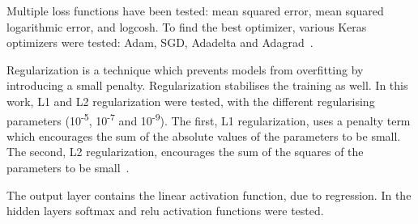 \documentclass[10pt, paper=a4, UKenglish]{article}
\begin{document}

Multiple loss functions have been tested: mean squared error, mean squared logarithmic error, and logcosh. To find the best optimizer, various Keras optimizers were tested: Adam, SGD, Adadelta and Adagrad~\cite{optimizers_overview}.

Regularization is a technique which prevents models from overfitting by introducing a small penalty. Regularization stabilises the training as well. In this work, L1 and L2 regularization were tested, with the different regularising parameters (10\textsuperscript{-5}, 10\textsuperscript{-7} and 10\textsuperscript{-9}). The first, L1 regularization, uses a penalty term which encourages the sum of the absolute values of the parameters to be small. The second, L2 regularization, encourages the sum of the squares of the parameters to be small~\cite{andrewng_reg}.

The output layer contains the linear activation function, due to regression. In the hidden layers softmax and relu activation functions were tested.
\end{document}
